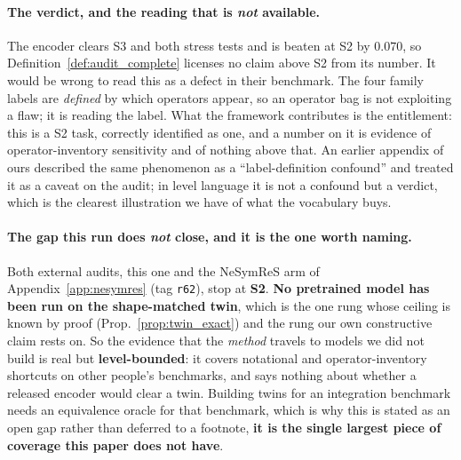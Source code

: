 \paragraph{The verdict, and the reading that is \emph{not} available.} The encoder clears S3 and both stress tests and is beaten at S2 by $0.070$, so Definition~\ref{def:audit_complete} licenses no claim above S2 from its number. It would be wrong to read this as a defect in their benchmark. The four family labels are \emph{defined} by which operators appear, so an operator bag is not exploiting a flaw; it is reading the label. What the framework contributes is the entitlement: this is a S2 task, correctly identified as one, and a number on it is evidence of operator-inventory sensitivity and of nothing above that. An earlier appendix of ours described the same phenomenon as a ``label-definition confound'' and treated it as a caveat on the audit; in level language it is not a confound but a verdict, which is the clearest illustration we have of what the vocabulary buys.

\paragraph{The gap this run does \emph{not} close, and it is the one worth naming.} Both external audits, this one and the NeSymReS arm of Appendix~\ref{app:nesymres} (tag \texttt{r62}), stop at \textbf{S2}. \textbf{No pretrained model has been run on the shape-matched twin}, which is the one rung whose ceiling is known by proof (Prop.~\ref{prop:twin_exact}) and the rung our own constructive claim rests on. So the evidence that the \emph{method} travels to models we did not build is real but \textbf{level-bounded}: it covers notational and operator-inventory shortcuts on other people's benchmarks, and says nothing about whether a released encoder would clear a twin. Building twins for an integration benchmark needs an equivalence oracle for that benchmark, which is why this is stated as an open gap rather than deferred to a footnote, \textbf{it is the single largest piece of coverage this paper does not have}.

